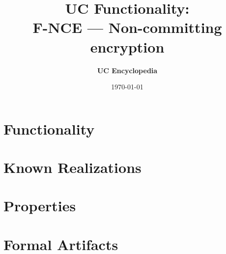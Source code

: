 \documentclass[11pt,a4paper]{article}
\title{\textbf{\Large UC Functionality:}\\[0.2em] \Large F-NCE --- Non-committing encryption}
\author{\textbf{UC Encyclopedia}}
\date{\today}
\newtheorem{functionality}{Functionality}
\begin{document}
\maketitle

\begin{abstract}
\end{abstract}

\section{Functionality}

%

\section{Known Realizations}


\section{Properties}


\section{Formal Artifacts}

\end{document}
